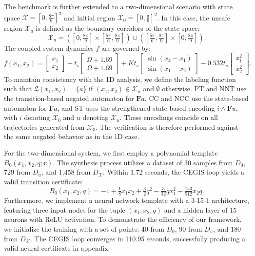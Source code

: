 The benchmark is further extended to a two-dimensional scenario with state space $\mathcal{X} = [0, \frac{8\pi}{9}]^2$ and initial region $\mathcal{X}_0 = [0, \frac{\pi}{9}]^2$. In this case, the unsafe region $\mathcal{X}_u$ is defined as the boundary corridors of the state space:
\begin{equation}
\mathcal{X}_u = \left([0, \tfrac{8\pi}{9}] \times [\tfrac{5\pi}{6}, \tfrac{8\pi}{9}]\right) \cup \left([\tfrac{5\pi}{6}, \tfrac{8\pi}{9}] \times [0, \tfrac{8\pi}{9}]\right).
\end{equation}
The coupled system dynamics $f$ are governed by:
\begin{equation}
f(x_1, x_2) =
\begin{bmatrix} x_1 \\ x_2 \end{bmatrix}
+ t_s
\begin{bmatrix} \Omega + 1.69 \\ \Omega + 1.69 \end{bmatrix}
+ K t_s
\begin{bmatrix} \sin(x_2 - x_1) \\ \sin(x_1 - x_2) \end{bmatrix}
- 0.532 t_s
\begin{bmatrix} x_1^2 \\ x_2^2 \end{bmatrix}.
\end{equation}
To maintain consistency with the 1D analysis, we define the labeling function such that $\mathfrak{L}(x_1, x_2) = \{a\}$ if $(x_1, x_2) \in \mathcal{X}_u$ and $\emptyset$ otherwise. PT and NNT use the transition-based negated automaton for $\mathbf{F} a$, CC and NCC use the state-based automaton for $\mathbf{F}a$, and ST uses the strengthened state-based encoding $i \land \mathbf{F}u$, with $i$ denoting $\mathcal{X}_0$ and $u$ denoting $\mathcal{X}_u$. These encodings coincide on all trajectories generated from $\mathcal{X}_0$. The verification is therefore performed against the same negated behavior as in the 1D case.


For the two-dimensional system, we first employ a polynomial template $B_0(x_1, x_2, q; \mathbf{c})$. The synthesis process utilizes a dataset of 30 samples from $D_0$, 729 from $D_u$, and 1,458 from $D_{\mathcal{X}}$. Within 1.72 seconds, the CEGIS loop yields a valid transition certificate:
\begin{equation}
B_0(x_1, x_2, q) = -1 + \tfrac{1}{8}x_1 x_2 + \tfrac{3}{2}q^2 - \tfrac{3}{32}q x_1^2 - \tfrac{153}{512}x_2 q.
\end{equation}
Furthermore, we implement a neural network template with a 3-15-1 architecture, featuring three input nodes for the tuple $(x_1, x_2, q)$ and a hidden layer of 15 neurons with ReLU activation. To demonstrate the efficiency of our framework, we initialize the training with a set of points: 40 from $D_0$, 90 from $D_u$, and 180 from $D_{\mathcal{X}}$. The CEGIS loop converges in 110.95 seconds, successfully producing a valid neural certificate in appendix.


